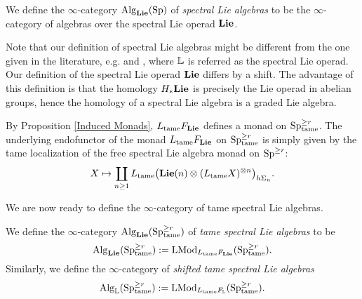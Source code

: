 \begin{definition}
\label{Spectral Lie operad}
We define the $\infty$-category $\operatorname{Alg}_{\mathbf{Lie}}(\operatorname{Sp})$ of \emph{spectral Lie algebras} to be the $\infty$-category of algebras over the spectral Lie operad $\mathbf{Lie}$.
\end{definition}

\begin{remark}
Note that our definition of spectral Lie algebras might be different from the one given in the literature, e.g. \cite{Camarena_mod2_free_spectral_Lie_algebra} and \cite{ChingBar}, where ${\mathbb{L}}$ is referred as the spectral Lie operad. 
Our definition of the spectral Lie operad $\mathbf{Lie}$ differs by a shift.
The advantage of this definition is that the homology $H_{*}\mathbf{Lie}$ is precisely the Lie operad in abelian groups, hence the homology of a spectral Lie algebra is a graded Lie algebra.
\end{remark}

By Proposition \ref{Induced Monads}, $L_{\operatorname{\operatorname{tame}}}F_{\mathbf{Lie}}$ defines a monad on $\operatorname{Sp}^{\geq r}_{\operatorname{\operatorname{tame}}}$.
The underlying endofunctor of the monad $L_{\operatorname{\operatorname{tame}}}F_{\mathbf{Lie}}$ on $\operatorname{Sp}^{\geq r}_{\operatorname{\operatorname{tame}}}$ is simply given by the tame localization of the free spectral Lie algebra monad on $\operatorname{Sp}^{\geq r}$:
\begin{align*}
X \mapsto  
\coprod_{n\geq 1}
		L_{\operatorname{\operatorname{tame}}}\big(
		 \mathbf{Lie}(n) \otimes (L_{\operatorname{\operatorname{tame}}} X)^{\otimes n}
		\big)_{h\Sigma_n}.
\end{align*}


We are now ready to define the $\infty$-category of tame spectral Lie algebras.
\begin{definition}
\label{Def of tame spectral Lie algebras}
    We define the $\infty$-category $\operatorname{Alg}_{\mathbf{Lie}}(\operatorname{Sp}^{\geq r}_{\operatorname{\operatorname{tame}}})$ of \emph{tame spectral Lie algebras} to be 
    $$
    \operatorname{Alg}_{\mathbf{Lie}}(\operatorname{Sp}^{\geq r}_{\operatorname{\operatorname{tame}}}) := \operatorname{LMod}_{	L_{\operatorname{\operatorname{tame}}}F_{\mathbf{Lie}}}(\operatorname{Sp}^{\geq r}_{\operatorname{\operatorname{tame}}}).
    $$
    Similarly, we define the $\infty$-category of \emph{shifted tame spectral Lie algebras}
    $$
    \operatorname{Alg}_{{\mathbb{L}}}(\operatorname{Sp}^{\geq r}_{\operatorname{\operatorname{tame}}}) := \operatorname{LMod}_{	L_{\operatorname{\operatorname{tame}}}F_{{\mathbb{L}}}}(\operatorname{Sp}^{\geq r}_{\operatorname{\operatorname{tame}}}).
    $$
\end{definition}

